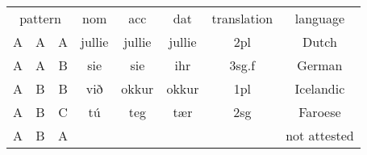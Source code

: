 
\begin{tabular}{cccccccc}
  \toprule
      \multicolumn{3}{c}{pattern}
        & \ac{nom}
        & \ac{acc}
        & \ac{dat}
        & translation
        & language \\
  \cmidrule(lr){1-3} \cmidrule(lr){4-6} \cmidrule(lr){7-7} \cmidrule(lr){8-8}
      A & A & A
        & \cellcolor{LG}jullie
        & \cellcolor{LG}jullie
        & \cellcolor{LG}jullie
        & 2\ac{pl}
        & Dutch \\
      A & A & B
        & \cellcolor{LG}sie
        & \cellcolor{LG}sie
        & ihr
        & 3\ac{sg}.\ac{f}
        & German \\
      A & B & B
        & við
        & \cellcolor{LG}okkur
        & \cellcolor{LG}okkur
        & 1\ac{pl}
        & Icelandic \\
      A & B & C
        & tú
        & teg
        & tær
        & 2\ac{sg}
        & Faroese \\
      A & B & A
        & \cellcolor{LG}
        &
        & \cellcolor{LG}
        &
        & not attested \\
  \bottomrule
\end{tabular}
